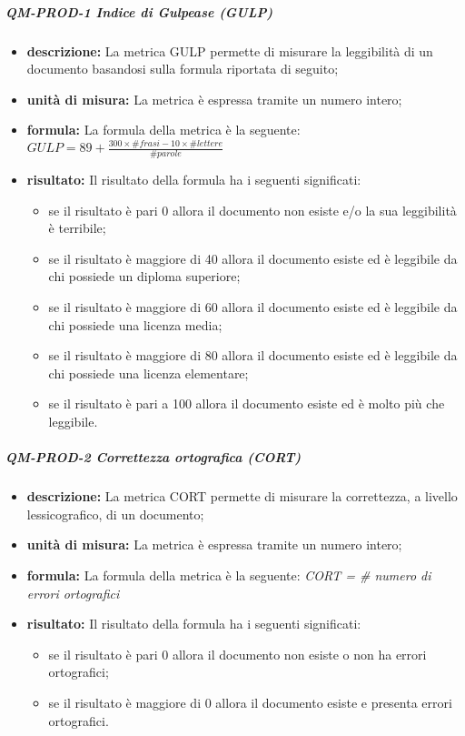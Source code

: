 				\subparagraph{QM-PROD-1 Indice di Gulpease (GULP)}
				\begin{itemize}
					\item \textbf{descrizione: }
						La metrica GULP permette di misurare la leggibilità di un documento basandosi sulla formula riportata di seguito;
					\item \textbf{unità di misura: }
						La metrica è espressa tramite un numero intero;
					\item \textbf{formula:}
						La formula della metrica è la seguente:
						\(
							GULP = 89+\frac{300\times\# frasi-10\times\#lettere}{\#parole}
						\)
					\item \textbf{risultato:}
						Il risultato della formula ha i seguenti significati:
						\begin{itemize}
							\item se il risultato è pari 0 allora il documento non esiste e/o la sua leggibilità è terribile;
							\item se il risultato è maggiore di 40 allora il documento esiste ed è leggibile da chi possiede un diploma superiore;
							\item se il risultato è maggiore di 60 allora il documento esiste ed è leggibile da chi possiede una licenza media;
							\item se il risultato è maggiore di 80 allora il documento esiste ed è leggibile da chi possiede una licenza elementare;
							\item se il risultato è pari a 100 allora il documento esiste ed è molto più che leggibile.
						\end{itemize}
				\end{itemize}
				\subparagraph{QM-PROD-2 Correttezza ortografica (CORT)}
				\begin{itemize}
					\item \textbf{descrizione: }
						La metrica CORT permette di misurare la correttezza, a livello lessicografico, di un documento;
					\item \textbf{unità di misura:}
						La metrica è espressa tramite un numero intero;
					\item \textbf{formula: }
					La formula della metrica è la seguente:
						\textit{CORT = \# numero di errori ortografici}
					\item \textbf{risultato: }
						Il risultato della formula ha i seguenti significati:
						\begin{itemize}
							\item se il risultato è pari 0 allora il documento non esiste o non ha errori ortografici;
							\item se il risultato è maggiore di 0 allora il documento esiste e presenta errori ortografici.
						\end{itemize}
				\end{itemize}

